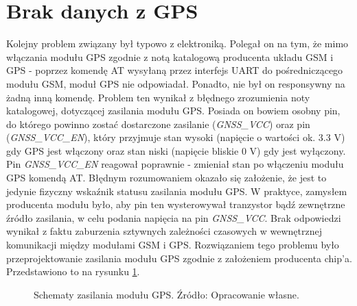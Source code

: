 \section{Brak danych z GPS}

Kolejny problem związany był typowo z elektroniką. Polegał on na tym, że mimo włączania modułu GPS zgodnie z notą katalogową producenta układu GSM i GPS - poprzez komendę AT wysyłaną przez interfejs UART do pośredniczącego modułu GSM, moduł GPS nie odpowiadał. Ponadto, nie był on responsywny na żadną inną komendę. Problem ten wynikał z błędnego zrozumienia noty katalogowej, dotyczącej zasilania modułu GPS. Posiada on bowiem osobny pin, do którego powinno zostać dostarczone zasilanie (\textit{GNSS\_VCC}) oraz pin (\textit{GNSS\_VCC\_EN}), który przyjmuje stan wysoki (napięcie o wartości ok. 3.3 V) gdy GPS jest włączony oraz stan niski (napięcie bliskie 0 V) gdy jest wyłączony. Pin \textit{GNSS\_VCC\_EN} reagował poprawnie - zmieniał stan po włączeniu modułu GPS komendą AT. Błędnym rozumowaniem okazało się założenie, że jest to jedynie fizyczny wskaźnik statusu zasilania modułu GPS. W praktyce, zamysłem producenta modułu było, aby pin ten wysterowywał tranzystor bądź zewnętrzne źródło zasilania, w celu podania napięcia na pin \textit{GNSS\_VCC}. Brak odpowiedzi wynikał z faktu zaburzenia sztywnych zależności czasowych w wewnętrznej komunikacji między modułami GSM i GPS. Rozwiązaniem tego problemu było przeprojektowanie zasilania modułu GPS zgodnie z założeniem producenta chip'a. Przedstawiono to na rysunku \ref{fig:image_mistake_gps_power}.

\begin{figure}[H]
\centering
	\qquad
	
	\caption{Schematy zasilania modułu GPS. Źródło: Opracowanie własne.}
	\label{fig:image_mistake_gps_power}
\end{figure}

